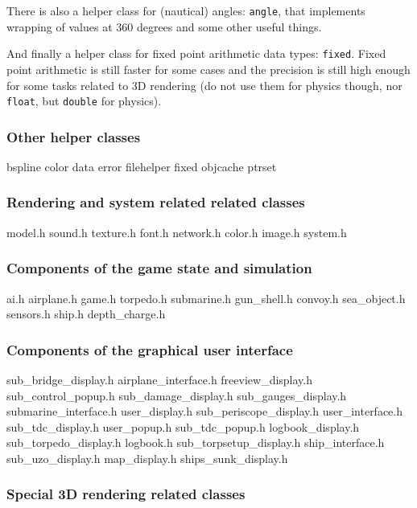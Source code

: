 \documentclass{report}
\begin{document}
There is also a helper class for (nautical) angles: \texttt{angle}, that
implements wrapping of values at 360 degrees and some other useful
things.

And finally a helper class for fixed point arithmetic data types:
\texttt{fixed}. Fixed point arithmetic is still faster for some cases
and the precision is still high enough for some tasks related to 3D
rendering (do not use them for physics though, nor \texttt{float}, but
\texttt{double} for physics).

\subsubsection{Other helper classes}
    
bspline color data error filehelper fixed objcache ptrset

\subsubsection{Rendering and system related related classes}

model.h sound.h texture.h font.h network.h color.h image.h system.h

\subsubsection{Components of the game state and simulation}

ai.h airplane.h game.h torpedo.h submarine.h gun_shell.h convoy.h
sea_object.h sensors.h ship.h depth_charge.h

\subsubsection{Components of the graphical user interface}

sub_bridge_display.h airplane_interface.h freeview_display.h
sub_control_popup.h sub_damage_display.h sub_gauges_display.h
submarine_interface.h user_display.h sub_periscope_display.h
user_interface.h sub_tdc_display.h user_popup.h sub_tdc_popup.h
logbook_display.h sub_torpedo_display.h logbook.h
sub_torpsetup_display.h ship_interface.h sub_uzo_display.h map_display.h
ships_sunk_display.h

\subsubsection{Special 3D rendering related classes}
\end{document}
